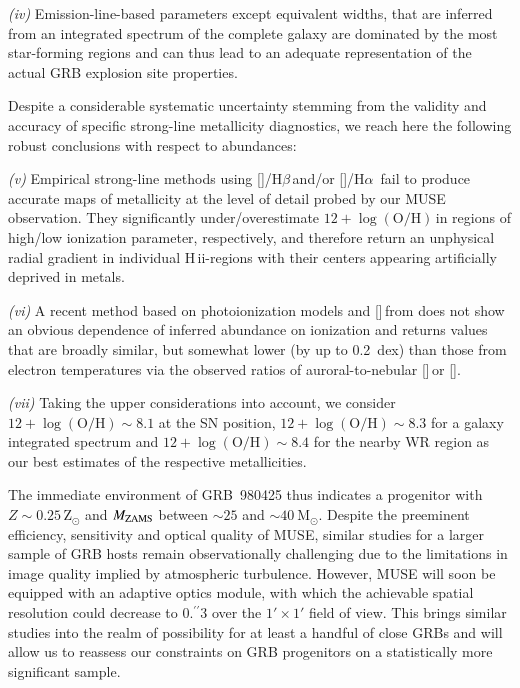 \documentclass[traditabstract]{aa}
\newcommand{\farc}{\hbox{$.\!\!^{\prime\prime}$}}
\newcommand{\hb}{H$\beta$}
\newcommand{\ha}{H$\alpha$}
\newcommand{\hii}{\mbox{H\,{\sc ii}}}
\newcommand{\oh}{12+\log(\mathrm{O/H})}
\newcommand{\sii}{[\ion{S}{ii}]}
\newcommand{\siii}{[\ion{S}{iii}]}
\newcommand{\oiii}{[\ion{O}{iii}]}
\newcommand{\nii}{[\ion{N}{ii}]}
\begin{document}
\textit{(iv)} Emission-line-based parameters except equivalent widths, that are inferred from an integrated spectrum of the complete galaxy are dominated by the most star-forming regions and can thus lead to an adequate representation of the actual GRB explosion site properties.

Despite a considerable systematic uncertainty stemming from the validity and accuracy of specific strong-line metallicity diagnostics, we reach here the following robust conclusions with respect to abundances:

\textit{(v)} Empirical strong-line methods using \oiii/\hb\,and/or \nii/\ha\, fail to produce accurate maps of metallicity at the level of detail probed by our MUSE observation. They significantly under/overestimate $\oh$\,in regions of high/low ionization parameter, respectively, and therefore return an unphysical radial gradient in individual \hii-regions with their centers appearing artificially deprived in metals.

\textit{(vi)} A recent method based on photoionization models and \sii\,from \citet{2016Ap&SS.361...61D} does not show an obvious dependence of inferred abundance on ionization and returns values that are broadly similar, but somewhat lower (by up to 0.2~dex) than those from electron temperatures via the observed ratios of auroral-to-nebular \siii\,or \oiii. 

\textit{(vii)} Taking the upper considerations into account, we consider $\oh\sim8.1$ at the SN position, $\oh\sim8.3$ for a galaxy integrated spectrum and $\oh\sim8.4$ for the nearby WR region as our best estimates of the respective metallicities. 

The immediate environment of GRB~980425 thus indicates a progenitor with $Z\sim0.25\,\mathrm{Z}_\odot$ and $M_{\rm{ZAMS}}$ between $\sim 25$ and $\sim40~\mathrm{M}_{\odot}$. Despite the preeminent efficiency, sensitivity and optical quality of MUSE, similar studies for a larger sample of GRB hosts remain observationally challenging due to the limitations in image quality implied by atmospheric turbulence. However, MUSE will soon be equipped with an adaptive optics module, with which the achievable spatial resolution could decrease to 0\farc{3} over the $1'\times1'$ field of view. This brings similar studies into the realm of possibility for at least a handful of close GRBs and will allow us to reassess our constraints on GRB progenitors on a statistically more significant sample.
\end{document}
